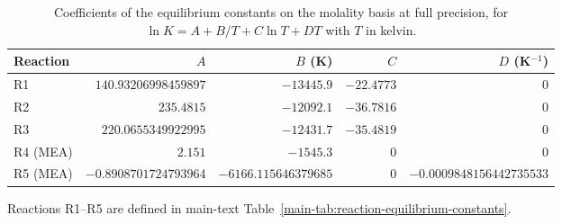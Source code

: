 \begin{table}[!htbp]\small\setlength{\tabcolsep}{3pt}\centering
\caption{Coefficients of the equilibrium constants on the molality basis at full precision, for $\ln K=A+B/T+C\ln T+DT$ with $T$ in kelvin.}\label{tab:supplement-reaction-coefficients}
\begin{tabular}{@{}lrrrr@{}}
\toprule
Reaction & $A$ & $B$ (K) & $C$ & $D$ (K$^{-1}$) \\
\midrule
R1 & $140.93206998459897$ & $\num{-13445.9}$ & $-22.4773$ & $0$ \\
R2 & $235.4815$ & $\num{-12092.1}$ & $-36.7816$ & $0$ \\
R3 & $220.0655349922995$ & $\num{-12431.7}$ & $-35.4819$ & $0$ \\
R4 (MEA) & $2.151$ & $-1545.3$ & $0$ & $0$ \\
R5 (MEA) & $-0.8908701724793964$ & $-6166.115646379685$ & $0$ & $-0.0009848156442735533$ \\
\bottomrule
\end{tabular}
\par\smallskip\parbox{\linewidth}{\footnotesize\raggedright Reactions R1--R5 are defined in main-text Table~\ref{main-tab:reaction-equilibrium-constants}.}
\end{table}
